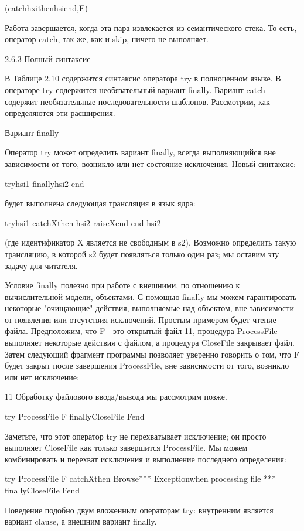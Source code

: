 (catchhxithenhsiend,E)

Работа завершается, когда эта пара извлекается из семантического стека. То есть, оператор catch, так же, как и skip, ничего не выполняет.

2.6.3 Полный синтаксис

В Таблице 2.10 содержится синтаксис оператора try в полноценном языке. В операторе try содержится необязательный вариант finally. Вариант catch содержит необязательные последовательности шаблонов. Рассмотрим, как определяются эти расширения.

Вариант finally

Оператор try может определить вариант finally, всегда выполняющийся вне зависимости от того, возникло или нет состояние исключения. Новый синтаксис:

tryhsi1 finallyhsi2 end

будет выполнена следующая трансляция в язык ядра:

tryhsi1
catchXthen
hsi2
raiseXend
end
hsi2

(где идентификатор X является не свободным в s2). Возможно определить такую трансляцию, в которой s2 будет появляться только один раз; мы оставим эту задачу для читателя.

Условие finally полезно при работе с внешними, по отношению к вычислительной модели, объектами. С помощью finally мы можем гарантировать некоторые "очищающие" действия, выполняемые над объектом, вне зависимости от появления или отсутствия исключений. Простым примером будет чтение файла. Предположим, что F - это открытый файл 11, процедура ProcessFile выполняет некоторые действия с файлом, а процедура CloseFile закрывает файл. Затем следующий фрагмент программы позволяет уверенно говорить о том, что F будет закрыт после завершения ProcessFile, вне зависимости от того, возникло или нет исключение:

11 Обработку файлового ввода/вывода мы рассмотрим позже.

try
{ProcessFile F}
finally{CloseFile F}end

Заметьте, что этот оператор try не перехватывает исключение; он просто выполняет CloseFile как только завершится ProcessFile. Мы можем комбинировать и перехват исключения и выполнение последнего определения:

try
{ProcessFile F}
catchXthen
{Browse*** Exceptionwhen processing file ***}
finally{CloseFile F}end

Поведение подобно двум вложенным операторам try: внутренним является вариант clause, а внешним вариант finally.

